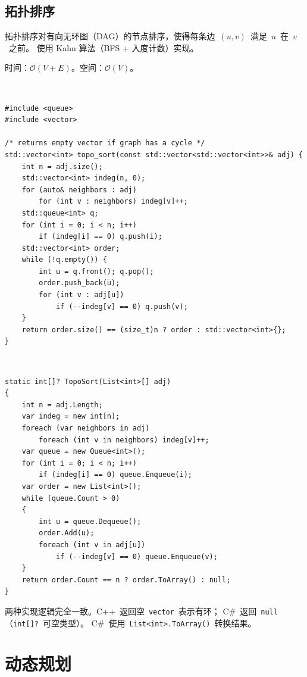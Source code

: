 \documentclass[12pt,a4paper,fontset=fandol]{ctexbook}
\newcommand{\cpplabel}{%
  \noindent\begin{tcolorbox}[sharp corners,colback=cppheadbg,colframe=cppheadbg,
    left=6pt,right=6pt,top=2pt,bottom=2pt,boxrule=0pt]
  \textcolor{white}{\small\bfseries\sffamily C++}\end{tcolorbox}%
}
\newcommand{\csharplabel}{%
  \noindent\begin{tcolorbox}[sharp corners,colback=csharpheadbg,colframe=csharpheadbg,
    left=6pt,right=6pt,top=2pt,bottom=2pt,boxrule=0pt]
  \textcolor{white}{\small\bfseries\sffamily C\#}\end{tcolorbox}%
}
\newcommand{\bigO}[1]{\mathcal{O}(#1)}
\newcommand{\Tp}[1]{\texttt{#1}}
\begin{document}
\chapter{拓扑排序}

拓扑排序对有向无环图（DAG）的节点排序，使得每条边~$(u,v)$~满足~$u$~在~$v$~之前。
使用 Kahn 算法（BFS + 入度计数）实现。

\begin{complexitybox}
  时间：$\bigO{V + E}$。空间：$\bigO{V}$。
\end{complexitybox}

\cpplabel
\begin{lstlisting}[style=cppstyle]
#include <queue>
#include <vector>

/* returns empty vector if graph has a cycle */
std::vector<int> topo_sort(const std::vector<std::vector<int>>& adj) {
    int n = adj.size();
    std::vector<int> indeg(n, 0);
    for (auto& neighbors : adj)
        for (int v : neighbors) indeg[v]++;
    std::queue<int> q;
    for (int i = 0; i < n; i++)
        if (indeg[i] == 0) q.push(i);
    std::vector<int> order;
    while (!q.empty()) {
        int u = q.front(); q.pop();
        order.push_back(u);
        for (int v : adj[u])
            if (--indeg[v] == 0) q.push(v);
    }
    return order.size() == (size_t)n ? order : std::vector<int>{};
}
\end{lstlisting}

\csharplabel
\begin{lstlisting}[style=csharpstyle]
static int[]? TopoSort(List<int>[] adj)
{
    int n = adj.Length;
    var indeg = new int[n];
    foreach (var neighbors in adj)
        foreach (int v in neighbors) indeg[v]++;
    var queue = new Queue<int>();
    for (int i = 0; i < n; i++)
        if (indeg[i] == 0) queue.Enqueue(i);
    var order = new List<int>();
    while (queue.Count > 0)
    {
        int u = queue.Dequeue();
        order.Add(u);
        foreach (int v in adj[u])
            if (--indeg[v] == 0) queue.Enqueue(v);
    }
    return order.Count == n ? order.ToArray() : null;
}
\end{lstlisting}

\begin{compare}
两种实现逻辑完全一致。C++~返回空~\Tp{vector}~表示有环；
C\#~返回~\texttt{null}（\Tp{int[]?}~可空类型）。
C\#~使用~\Tp{List<int>.ToArray()}~转换结果。
\end{compare}

\part{动态规划}
\end{document}
